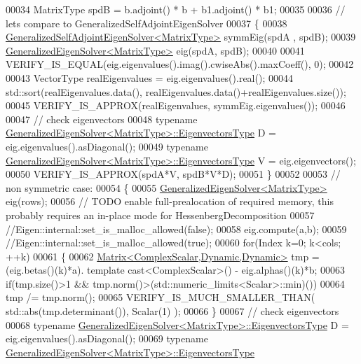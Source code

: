 \begin{DoxyCode}
00034   MatrixType spdB =  b.adjoint() * b + b1.adjoint() * b1;
00035 
00036   \textcolor{comment}{// lets compare to GeneralizedSelfAdjointEigenSolver}
00037   \{
00038     \hyperlink{group___eigenvalues___module_class_eigen_1_1_generalized_self_adjoint_eigen_solver}{GeneralizedSelfAdjointEigenSolver<MatrixType>} symmEig(spdA
      , spdB);
00039     \hyperlink{group___eigenvalues___module_class_eigen_1_1_generalized_eigen_solver}{GeneralizedEigenSolver<MatrixType>} eig(spdA, spdB);
00040 
00041     VERIFY\_IS\_EQUAL(eig.eigenvalues().imag().cwiseAbs().maxCoeff(), 0);
00042 
00043     VectorType realEigenvalues = eig.eigenvalues().real();
00044     std::sort(realEigenvalues.data(), realEigenvalues.data()+realEigenvalues.size());
00045     VERIFY\_IS\_APPROX(realEigenvalues, symmEig.eigenvalues());
00046 
00047     \textcolor{comment}{// check eigenvectors}
00048     \textcolor{keyword}{typename} \hyperlink{group___core___module}{GeneralizedEigenSolver<MatrixType>::EigenvectorsType}
       D = eig.eigenvalues().asDiagonal();
00049     \textcolor{keyword}{typename} \hyperlink{group___core___module}{GeneralizedEigenSolver<MatrixType>::EigenvectorsType}
       V = eig.eigenvectors();
00050     VERIFY\_IS\_APPROX(spdA*V, spdB*V*D);
00051   \}
00052 
00053   \textcolor{comment}{// non symmetric case:}
00054   \{
00055     \hyperlink{group___eigenvalues___module_class_eigen_1_1_generalized_eigen_solver}{GeneralizedEigenSolver<MatrixType>} eig(rows);
00056     \textcolor{comment}{// TODO enable full-prealocation of required memory, this probably requires an in-place mode for
       HessenbergDecomposition}
00057     \textcolor{comment}{//Eigen::internal::set\_is\_malloc\_allowed(false);}
00058     eig.compute(a,b);
00059     \textcolor{comment}{//Eigen::internal::set\_is\_malloc\_allowed(true);}
00060     \textcolor{keywordflow}{for}(Index k=0; k<cols; ++k)
00061     \{
00062       \hyperlink{group___core___module_class_eigen_1_1_matrix}{Matrix<ComplexScalar,Dynamic,Dynamic>} tmp = (eig.betas()(k)*a).
      template cast<ComplexScalar>() - eig.alphas()(k)*b;
00063       \textcolor{keywordflow}{if}(tmp.size()>1 && tmp.norm()>(std::numeric\_limits<Scalar>::min)())
00064         tmp /= tmp.norm();
00065       VERIFY\_IS\_MUCH\_SMALLER\_THAN( std::abs(tmp.determinant()), Scalar(1) );
00066     \}
00067     \textcolor{comment}{// check eigenvectors}
00068     \textcolor{keyword}{typename} \hyperlink{group___core___module}{GeneralizedEigenSolver<MatrixType>::EigenvectorsType}
       D = eig.eigenvalues().asDiagonal();
00069     \textcolor{keyword}{typename} \hyperlink{group___core___module}{GeneralizedEigenSolver<MatrixType>::EigenvectorsType}

\end{DoxyCode}
